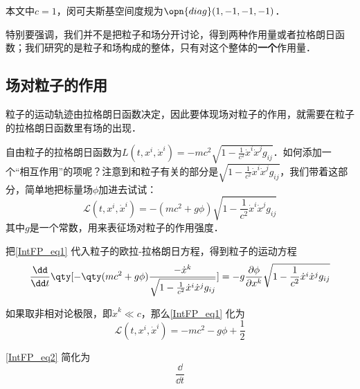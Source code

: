 

本文中$c=1$，闵可夫斯基空间度规为$\opn{diag}(1, -1, -1, -1)$．

特别要强调，我们并不是把粒子和场分开讨论，得到两种作用量或者拉格朗日函数；我们研究的是粒子和场构成的整体，只有对这个整体的\textbf{一个}作用量．

\subsection{场对粒子的作用}

粒子的运动轨迹由拉格朗日函数决定，因此要体现场对粒子的作用，就需要在粒子的拉格朗日函数里有场的出现．

自由粒子的拉格朗日函数为$L(t, x^i, \dot{x}^i) = -mc^2\sqrt{1-\frac{1}{c^2}\dot{x}^i\dot{x}^jg_{ij}}$．如何添加一个“相互作用”的项呢？注意到和粒子有关的部分是$\sqrt{1-\frac{1}{c^2}\dot{x}^i\dot{x}^jg_{ij}}$，我们带着这部分，简单地把标量场$\phi$加进去试试：
\begin{equation}\label{IntFP_eq1}
\mathcal{L}(t, x^i, \dot{x}^i) = -(mc^2+g\phi)\sqrt{1-\frac{1}{c^2}\dot{x}^i\dot{x}^jg_{ij}}
\end{equation}
其中$g$是一个常数，用来表征场对粒子的作用强度．

把\autoref{IntFP_eq1} 代入粒子的欧拉-拉格朗日方程，得到粒子的运动方程
\begin{equation}\label{IntFP_eq2}
\frac{\dd }{\dd t} \qty[-\qty(mc^2+g\phi)\frac{-\dot{x}^k}{\sqrt{1-\frac{1}{c^2}\dot{x}^i\dot{x}^jg_{ij}}}] = -g\frac{\partial \phi}{\partial x^k}\sqrt{1-\frac{1}{c^2}\dot{x}^i\dot{x}^jg_{ij}}
\end{equation}

如果取非相对论极限，即$\dot{x}^k\ll c$，那么\autoref{IntFP_eq1} 化为
\begin{equation}
\mathcal{L}(t, x^i, \dot{x}^i) = -mc^2-g\phi+\frac{1}{2}
\end{equation}

\autoref{IntFP_eq2} 简化为
\begin{equation}
\frac{\dd}{\dd t}
\end{equation}
























